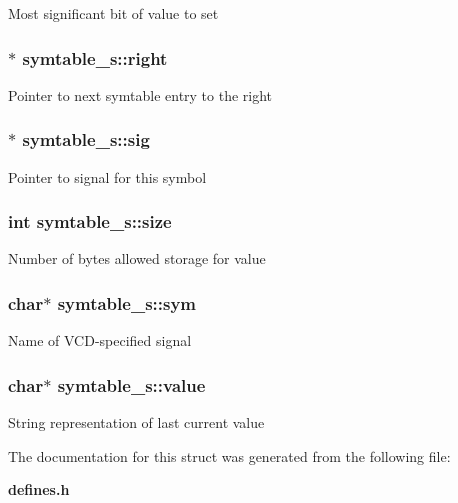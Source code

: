 Most significant bit of value to set 
\subsubsection{$\ast$ symtable\_\-s::right}\label{structsymtable__s_m6}


Pointer to next symtable entry to the right 
\subsubsection{$\ast$ symtable\_\-s::sig}\label{structsymtable__s_m1}


Pointer to signal for this symbol 
\subsubsection{\setlength{\rightskip}{0pt plus 5cm}int symtable\_\-s::size}\label{structsymtable__s_m5}


Number of bytes allowed storage for value 
\subsubsection{\setlength{\rightskip}{0pt plus 5cm}char$\ast$ symtable\_\-s::sym}\label{structsymtable__s_m0}


Name of VCD-specified signal 
\subsubsection{\setlength{\rightskip}{0pt plus 5cm}char$\ast$ symtable\_\-s::value}\label{structsymtable__s_m4}


String representation of last current value 

The documentation for this struct was generated from the following file:\begin{CompactItemize}
\item 
{\bf defines.h}\end{CompactItemize}
